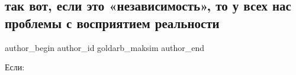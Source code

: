  
 
 
 
 
 
\subsection{так вот, если это «независимость», то у всех нас проблемы с восприятием реальности}
\label{sec:24_08_2021.fb.goldarb_maksim.1.nezavisimost_realnost}
 
\ifcmt
 author_begin
   author_id goldarb_maksim
 author_end
\fi

Если: 

